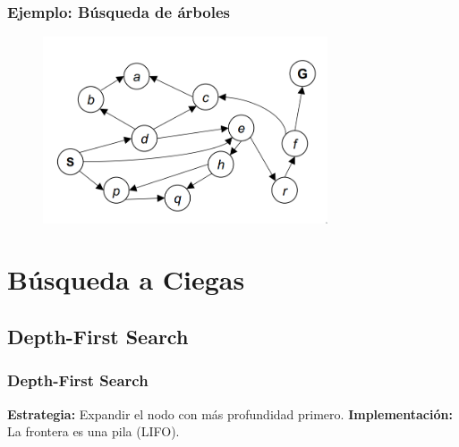 \documentclass[10pt]{beamer}
\begin{document}
\begin{frame}
  \frametitle{Ejemplo: Búsqueda de árboles}

  \begin{figure}[!h] 
    \centering
    \includegraphics[width=0.75\textwidth]{img/grafo3}
  \end{figure} 

\end{frame}

\section{Búsqueda a Ciegas}

\subsection{Depth-First Search}
\begin{frame}
  \frametitle{Depth-First Search}

  \textbf{Estrategia:} Expandir el nodo con más \alert{profundidad} primero.
  \textbf{Implementación:} La frontera es una \alert{pila} (LIFO).

\end{frame}
\end{document}

